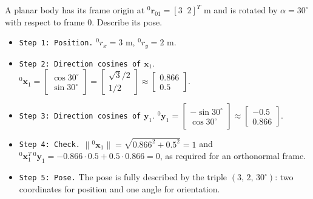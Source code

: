 \begin{example}
A planar body has its frame origin at ${}^0\mathbf{r}_{01}=[3\;\;2]^T$ m and is rotated by $\alpha=30^\circ$ with respect to frame 0. Describe its pose.
\begin{itemize}
    \item \texttt{Step 1: Position.} ${}^0r_x=3$ m, ${}^0r_y=2$ m.
    \vspace{0.2cm}
    \item \texttt{Step 2: Direction cosines of} $\mathbf{x}_1$. ${}^0\mathbf{x}_1=\begin{bmatrix}\cos30^\circ\\ \sin30^\circ\end{bmatrix}=\begin{bmatrix}\sqrt3/2\\ 1/2\end{bmatrix}\approx\begin{bmatrix}0.866\\0.5\end{bmatrix}$.
    \vspace{0.2cm}
    \item \texttt{Step 3: Direction cosines of} $\mathbf{y}_1$. ${}^0\mathbf{y}_1=\begin{bmatrix}-\sin30^\circ\\ \cos30^\circ\end{bmatrix}\approx\begin{bmatrix}-0.5\\0.866\end{bmatrix}$.
    \vspace{0.2cm}
    \item \texttt{Step 4: Check.} $\|{}^0\mathbf{x}_1\|=\sqrt{0.866^2+0.5^2}=1$ and ${}^0\mathbf{x}_1^T\,{}^0\mathbf{y}_1=-0.866\cdot0.5+0.5\cdot0.866=0$, as required for an orthonormal frame.
    \vspace{0.2cm}
    \item \texttt{Step 5: Pose.} The pose is fully described by the triple $(3,\,2,\,30^\circ)$: two coordinates for position and one angle for orientation.
\end{itemize}
\end{example}